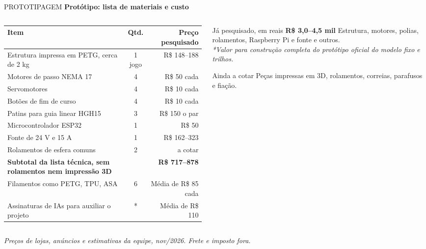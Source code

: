 \documentclass[aspectratio=169, 10pt]{beamer}
\newcommand{\currentpresenter}{Rodrigo}
\newcommand{\setpresenter}[1]{\renewcommand{\currentpresenter}{#1}}
\begin{document}
	\setpresenter{Gabriel}
	\begin{frame}{PROTOTIPAGEM}
		\textbf{\normalsize Protótipo: lista de materiais e custo}
		\vspace{0.1cm}
		
		\begin{columns}[T]
			\begin{column}{0.64\textwidth}
				\scriptsize
				\begin{tabularx}{\textwidth}{X c r}
					\toprule
					\textbf{Item} & \textbf{Qtd.} & \textbf{Preço pesquisado} \\
					\midrule
					Estrutura impressa em PETG, cerca de 2 kg & 1 jogo & R\$ 148--188 \\
					Motores de passo NEMA 17 & 4 & R\$ 50 cada \\
					Servomotores & 4 & R\$ 10 cada \\
					Botões de fim de curso & 4 & R\$ 10 cada \\
					Patins para guia linear HGH15 & 3 & R\$ 150 o par \\
					Microcontrolador ESP32 & 1 & R\$ 50 \\
					Fonte de 24 V e 15 A & 1 & R\$ 162--323 \\
					Rolamentos de esfera comuns & 2 & a cotar \\
					\midrule
					\textbf{Subtotal da lista técnica, sem rolamentos nem impressão 3D} & & \textbf{R\$ 717--878} \\
					\midrule
					Filamentos como PETG, TPU, ASA & 6 & Média de R\$ 85 cada \\
					Assinaturas de IAs para auxiliar o projeto & * & Média de R\$ 110 \\
					\bottomrule
				\end{tabularx}
			\end{column}
			
			\begin{column}{0.33\textwidth}
				\begin{block}{Já pesquisado, em reais}
					\centering\Large\textbf{\color{FlexoOrange}R\$ 3,0--4,5 mil}
					\flushleft\scriptsize\vspace{0.1cm}
					Estrutura, motores, polias, rolamentos, Raspberry Pi e fonte e outros.\\[3pt]
					\textit{*Valor para construção completa do protótipo oficial do modelo fixo e trilhos.}
				\end{block}
				
				\begin{block}{Ainda a cotar}
					\scriptsize Peças impressas em 3D, rolamentos, correias, parafusos e fiação.
				\end{block}
			\end{column}
		\end{columns}
		
		\vspace{0.1cm}
		{\tiny\textit{Preços de lojas, anúncios e estimativas da equipe, nov/2026. Frete e imposto fora.}}
	\end{frame}
	
\end{document}
